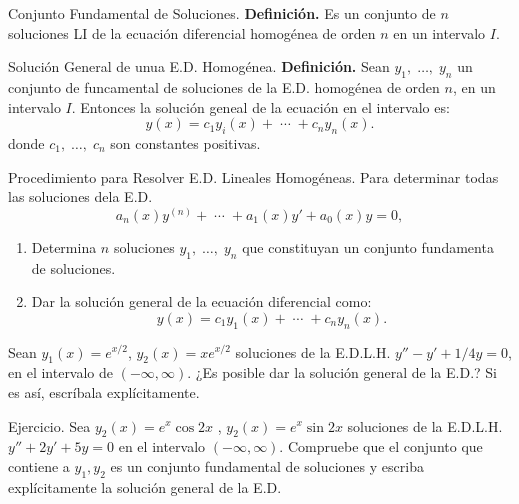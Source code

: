 \documentclass{beamer}
\begin{document}
\begin{frame}[t]
	\begin{block}{Conjunto Fundamental de Soluciones.}
		\textbf{Definición.} Es un conjunto de \(n\) soluciones LI de la ecuación diferencial homogénea de orden \(n\) en un intervalo \(I\).
	\end{block}
	\begin{block}{Solución General de unua E.D. Homogénea.}
		\textbf{Definición.} Sean \(y_1, \;\ldots,\; y_n\) un conjunto de funcamental de soluciones de la E.D. homogénea de orden \(n\), en un intervalo \(I\). Entonces la solución geneal de la ecuación en el intervalo es:
		\[
			y(x) = c_1y_i(x) + \;\cdots\; +c_ny_n(x).
		\]
		donde \(c_1, \;\ldots,\; c_n\) son constantes positivas.
	\end{block}
\end{frame}

\begin{frame}[t]
	\begin{block}{Procedimiento para Resolver E.D. Lineales Homogéneas.}
		Para determinar todas las soluciones dela E.D.
		\[
			a_n(x) y^{(n)} + \;\cdots\; + a_1(x) y' +a_0(x) y =0,
		\]
		\vspace{-6mm}
		\begin{enumerate}
			\item Determina \(n\) soluciones \(y_1, \;\ldots,\; y_n\) que constituyan un conjunto fundamenta de soluciones.
			\item Dar la solución general de la ecuación diferencial como:
			\[
				y(x) = c_1y_1(x) + \;\cdots\; +c_ny_n(x).
			\]
		\end{enumerate}
	\end{block}
	\begin{example}
		Sean \(y_1(x) = e^{x/2}\), \(y_2(x) = xe^{x/2}\) soluciones de la E.D.L.H. \(y'' -y' +1/4y=0\),  en el intervalo de \((- \infty , \infty)\). ¿Es posible dar la solución general de la E.D.? Si es así, escríbala explícitamente.
	\end{example}
\end{frame}
\begin{frame}[t]
\end{frame}

\begin{frame}[t]
	\begin{alertblock}{Ejercicio.}
		Sea \(y_2(x) = e^x \cos 2x\) , \(y_2(x) = e^x \sin 2x\) soluciones de la E.D.L.H. \(y'' +2y' +5y=0\) en el intervalo \((- \infty , \infty)\). Compruebe que el conjunto que contiene a \(y_1,y_2\) es un conjunto fundamental de soluciones y escriba explícitamente la solución general de la E.D.
	\end{alertblock}
\end{frame}
\end{document}
